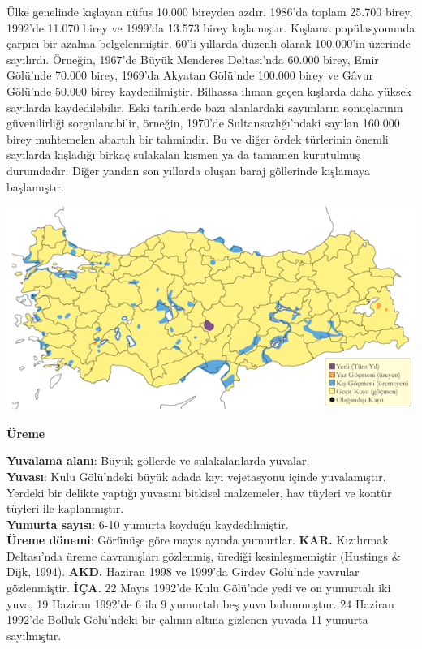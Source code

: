 \documentclass[
  a4paper,
  DIV=11,
  numbers=noendperiod]{scrreprt}
\begin{document}
Ülke genelinde kışlayan nüfus 10.000 bireyden azdır. 1986'da toplam
25.700 birey, 1992'de 11.070 birey ve 1999'da 13.573 birey kışlamıştır.
Kışlama popülasyonunda çarpıcı bir azalma belgelenmiştir. 60'li yıllarda
düzenli olarak 100.000'in üzerinde sayılırdı. Örneğin, 1967'de Büyük
Menderes Deltası'nda 60.000 birey, Emir Gölü'nde 70.000 birey, 1969'da
Akyatan Gölü'nde 100.000 birey ve Gâvur Gölü'nde 50.000 birey
kaydedilmiştir. Bilhassa ılıman geçen kışlarda daha yüksek sayılarda
kaydedilebilir. Eski tarihlerde bazı alanlardaki sayımların sonuçlarının
güvenilirliği sorgulanabilir, örneğin, 1970'de Sultansazlığı'ndaki
sayılan 160.000 birey muhtemelen abartılı bir tahmindir. Bu ve diğer
ördek türlerinin önemli sayılarda kışladığı birkaç sulakalan kısmen ya
da tamamen kurutulmuş durumdadır. Diğer yandan son yıllarda oluşan baraj
göllerinde kışlamaya başlamıştır.

\includegraphics{images/harita_Page_018.png}

\textbf{Üreme}

\textbf{Yuvalama alanı}: Büyük göllerde ve sulakalanlarda yuvalar.\\
\textbf{Yuvası}: Kulu Gölü'ndeki büyük adada kıyı vejetasyonu içinde
yuvalamıştır. Yerdeki bir delikte yaptığı yuvasını bitkisel malzemeler,
hav tüyleri ve kontür tüyleri ile kaplanmıştır.\\
\textbf{Yumurta sayısı}: 6-10 yumurta koyduğu kaydedilmiştir.\\
\textbf{Üreme dönemi}: Görünüşe göre mayıs ayında yumurtlar.
\textbf{KAR.} Kızılırmak Deltası'nda üreme davranışları gözlenmiş,
ürediği kesinleşmemiştir (Hustings \& Dijk, 1994). \textbf{AKD.} Haziran
1998 ve 1999'da Girdev Gölü'nde yavrular gözlenmiştir. \textbf{İÇA.} 22
Mayıs 1992'de Kulu Gölü'nde yedi ve on yumurtalı iki yuva, 19 Haziran
1992'de 6 ila 9 yumurtalı beş yuva bulunmuştur. 24 Haziran 1992'de
Bolluk Gölü'ndeki bir çalının altına gizlenen yuvada 11 yumurta
sayılmıştır.
\end{document}
